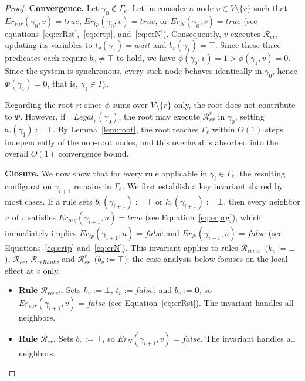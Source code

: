 \documentclass[a4paper, 12pt]{article}
\newcommand{\bz}{\mathbf{0}}
\newcommand{\rk}{k}
\newcommand{\Rer}{$\mathscr{R}_{er}$}
\newcommand{\Rreset}{$\mathscr{R}_{reset}$}
\newcommand{\RerRank}{$\mathscr{R}_{erRank}$}
\newcommand{\RerRoot}{$\mathscr{R}^r_{er}$}
\begin{document}
\begin{proof}
\textbf{Convergence.} Let $\gamma_0 \notin \Gamma_{\bar{e}}$. Let us consider 
a node $v \in V \setminus \{r\}$ such that \mbox{$Er_{var}(\gamma_0,v) = 
\mathit{true}$}, \mbox{$Er_{tp}(\gamma_0,v) = \mathit{true}$}, or 
$Er_{N}(\gamma_0,v) = \mathit{true}$ (see 
equations~\ref{eq:erRst},~\ref{eq:ertp}, and~\ref{eq:erN}). 
Consequently, $v$ executes \Rer, updating its variables to 
$t_v(\gamma_1) = \mathit{wait}$ and $b_v(\gamma_1) = \top$. Since 
these three predicates each require $b_v \neq \top$ to hold, we have 
\mbox{$\phi(\gamma_0, v) = 1 > \phi(\gamma_1, v) = 0$}. Since the system is 
synchronous, every such node behaves identically in $\gamma_0$, hence 
\mbox{$\Phi(\gamma_1) = 0$}, that is, $\gamma_1 \in \Gamma_{\bar{e}}$.

Regarding the root $r$: since $\phi$ sums over $V \setminus \{r\}$ 
only, the root does not contribute to $\Phi$. However, if 
$\neg\mathit{Legal}_r(\gamma_0)$, the root may execute \RerRoot\/ 
in $\gamma_0$, setting $b_r(\gamma_1) := \top$. By 
Lemma~\ref{lem:root}, the root reaches $\Gamma_r$ within $O(1)$ steps 
independently of the non-root nodes, and this overhead is absorbed into 
the overall $O(1)$ convergence bound.

\medskip
\textbf{Closure.} We now show that for every rule applicable in
$\gamma_i \in \Gamma_{\bar{e}}$, the resulting configuration
$\gamma_{i+1}$ remains in $\Gamma_{\bar{e}}$.
We first establish a key invariant shared by most cases. If a rule
sets $b_v(\gamma_{i+1}) := \top$ or $\rk_v(\gamma_{i+1}) := \bot$,
then every neighbor $u$ of $v$ satisfies
$Er_{prg}(\gamma_{i+1}, u) = \mathit{true}$
(see Equation~\ref{eq:erprg}), which immediately implies
$Er_{tp}(\gamma_{i+1}, u) = \mathit{false}$ and
$Er_N(\gamma_{i+1}, u) = \mathit{false}$
(see Equations~\ref{eq:ertp} and~\ref{eq:erN}).
This invariant applies to rules \Rreset\ ($\rk_v := \bot$),
\Rer, \RerRank, and \RerRoot\ ($b_v := \top$);
the case analysis below focuses on the local effect at $v$ only.

\begin{itemize}

\item \textbf{Rule \Rreset.} Sets $\rk_v := \bot$,
$t_v := \mathit{false}$, and $b_v := \bz$, so
$Er_{var}(\gamma_{i+1}, v) = \mathit{false}$
(see Equation~\ref{eq:erRst}).
The invariant handles all neighbors.

\item \textbf{Rule \Rer.} Sets $b_v := \top$, so
$Er_N(\gamma_{i+1}, v) = \mathit{false}$.
The invariant handles all neighbors.


\end{itemize}
\end{proof}
\end{document}
